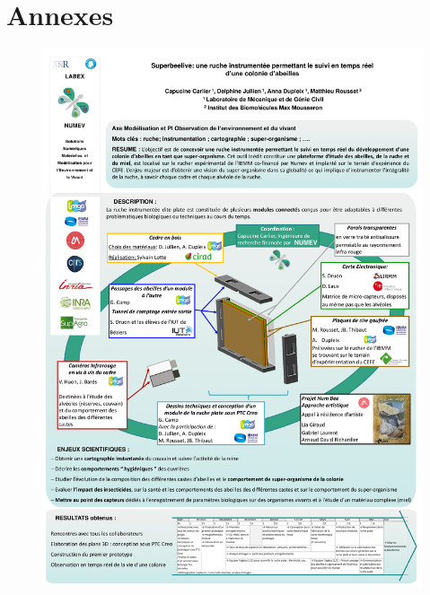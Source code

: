 \documentclass[11pt,french,a4paper]{report}
\begin{document}
\chapter{Annexes}
\begin{figure}[t]
    \includegraphics[scale=0.7]{../images/annexes/poster_numev.pdf}
    \label{an1}
\end{figure}
\end{document}

